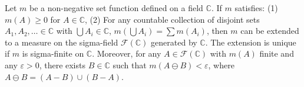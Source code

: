 Let $m$ be a non-negative set function defined on a field $\mathbb{C}$. If $m$ satisfies:
(1) $m(A) \geq 0$ for $A \in \mathbb{C}$,
(2) For any countable collection of disjoint sets $A_1, A_2, \ldots \in \mathbb{C}$ with $\bigcup A_i \in \mathbb{C}$, $m(\bigcup A_i) = \sum m(A_i)$,
then $m$ can be extended to a measure on the sigma-field $\mathscr{F}(\mathbb{C})$ generated by $\mathbb{C}$. The extension is unique if $m$ is sigma-finite on $\mathbb{C}$. Moreover, for any $A \in \mathscr{F}(\mathbb{C})$ with $m(A)$ finite and any $\varepsilon > 0$, there exists $B \in \mathbb{C}$ such that $m(A \ominus B) < \varepsilon$, where $A \ominus B = (A - B) \cup (B - A)$.
